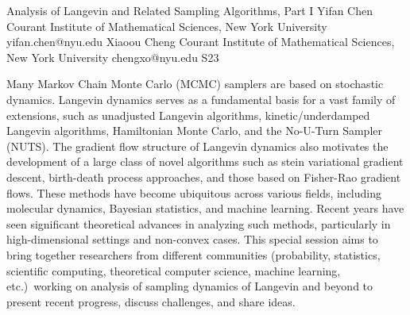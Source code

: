 

\clearpage

\begin{session}
 {Analysis of Langevin and Related Sampling Algorithms, Part I}%
 {Yifan Chen}%
 {Courant Institute of Mathematical Sciences, New York University}%
 {yifan.chen@nyu.edu}%
 {Xiaoou Cheng}%
 {Courant Institute of Mathematical Sciences, New York University}%
 {chengxo@nyu.edu}%
 {S23}%
 {}%

 {}
 Many Markov Chain Monte Carlo (MCMC) samplers are based on stochastic dynamics. Langevin dynamics serves as a fundamental basis for a vast family of extensions, such as unadjusted Langevin algorithms, kinetic/underdamped Langevin algorithms, Hamiltonian Monte Carlo, and the No-U-Turn Sampler (NUTS). The gradient flow structure of Langevin dynamics also motivates the development of a large class of novel algorithms such as stein variational gradient descent, birth-death process approaches, and those based on Fisher-Rao gradient flows. These methods have become ubiquitous across various fields, including molecular dynamics, Bayesian statistics, and machine learning. Recent years have seen significant theoretical advances in analyzing such methods, particularly in high-dimensional settings and non-convex cases. This special session aims to bring together researchers from different communities (probability, statistics, scientific computing, theoretical computer science, machine learning, etc.)\ working on analysis of sampling dynamics of Langevin and beyond to present recent progress, discuss challenges, and share ideas.
\end{session}



\clearpage

